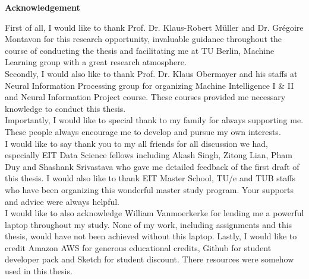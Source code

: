 \thispagestyle{empty}
\vspace*{3cm}
\begin{center}
    \textbf{Acknowledgement}
\end{center}

\noindent
First of all, I would like to thank Prof. Dr. Klaus-Robert M\"{u}ller and Dr. Gr\'{e}goire Montavon for this research opportunity, invaluable guidance throughout  the course of conducting the thesis and facilitating me at TU Berlin, Machine Learning group with a great research atmosphere.
\\

\noindent
Secondly, I would also like to thank Prof. Dr. Klaus Obermayer and his staffs at Neural Information Processing group for organizing Machine Intelligence I \& II and Neural Information Project course. These courses provided me necessary knowledge to conduct this thesis.
\\

\noindent
Importantly, I would like to special thank to my family for always supporting me. These people always encourage me to develop and pursue my own interests.
\\

\noindent
I would like to say thank you to my all friends for all discussion we had, especially EIT Data Science fellows including Akash Singh, Zitong Lian, Pham Duy and Shashank Srivastava who gave me detailed feedback of the first draft of this thesis. I would also like to thank EIT Master School, TU/e and TUB staffs who have been organizing this wonderful master study program. Your supports and advice were always helpful.
\\

\noindent
I would like to also acknowledge William Vanmoerkerke for lending me a powerful laptop throughout my study. None of my work, including assignments and  this thesis, would have not been achieved without this laptop.  Lastly, I would like to credit Amazon AWS for generous educational credits, Github for student developer pack and Sketch for student discount. There resources were somehow used in this thesis.